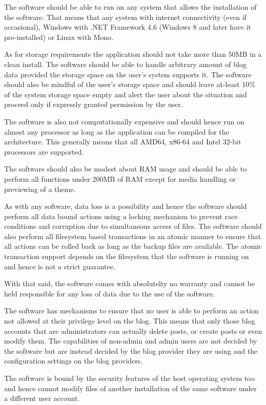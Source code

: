 

The software should be able to run on any system that allows the installation of the software. That means that any
system with internet connectivity (even if occasional), Windows with .NET Framework 4.6 (Windows 8 and later have it
pre-installed) or Linux with Mono.

As for storage requirements the application should not take more than 50MB in a clean install. The software should be
able to handle arbitrary amount of blog data provided the storage space on the user's system supports it. The software
should also be mindful of the user's storage space and should leave at-least 10\% of the system storage space empty and
alert the user about the situation and proceed only if expressly granted permission by the user.

The software is also not computationally expensive and should hence run on almost any processor as long as the
application can be compiled for the architecture. This generally means that all AMD64, x86-64 and Intel 32-bit
processors are supported.

The software should also be modest about RAM usage and should be able to perform all functions under 200MB of RAM except
for media handling or previewing of a theme.


As with any software, data loss is a possibility and hence the software should perform all data bound actions using a
locking mechanism to prevent race conditions and corruption due to simultaneous access of files. The software should
also perform all filesystem based transactions in an atomic manner to ensure that all actions can be rolled back as long
as the backup files are available. The atomic transaction support depends on the filesystem that the software is running
on and hence is not a strict guarantee.

With that said, the software comes with absolutelty no warranty and cannot be held responsible for any loss of data due
to the use of the software.


The software has mechanisms to ensure that no user is able to perform an action not allowed at their privilege level on
the blog. This means that only those blog accounts that are administrators can actually delete posts, or create posts or
even modify them. The capabilities of non-admin and admin users are not decided by the software but are instead decided
by the blog provider they are using and the configuration settings on the blog providers.

The software is bound by the security features of the host operating system too and hence cannot modify files of another
installation of the same software under a different user account.
